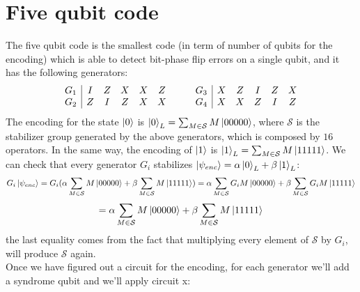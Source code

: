 \documentclass{article}
\begin{document}
	 \section{Five qubit code}
	 The five qubit code is the smallest code (in term of number of qubits for the encoding) which is able to detect bit-phase flip errors on a single qubit, and it has the following generators:
	 \[
	 \begin{array}{c|c c c c c}
	 	G_1 & I & Z & X & X & Z\\
	 	G_2 & Z & I & Z & X & X
	 \end{array}\qquad
	 \begin{array}{c|c c c c c}
	 	G_3 & X & Z & I & Z & X\\
	 	G_4 & X & X & Z & I & Z
	 \end{array}
	 \]
	 The encoding for the state $\ket{0}$ is $\ket{0}_L = \sum_{M \in \mathcal{S}}M\ket{00000}$, where $\mathcal{S}$ is the stabilizer group generated by the above generators, which is composed by $16$ operators. In the same way, the encoding of $\ket{1}$ is $\ket{1}_L = \sum_{M \in \mathcal{S}}M\ket{11111}$. We can check that every generator $G_i$ stabilizes $\ket{\psi_{enc}} = \alpha\ket{0}_L + \beta\ket{1}_L$:
	 \[ G_i\ket{\psi_{enc}} = G_i(\alpha\sum_{M \in \mathcal{S}}M\ket{00000} + \beta\sum_{M \in \mathcal{S}}M\ket{11111}) = \alpha\sum_{M \in \mathcal{S}}G_iM\ket{00000} + \beta\sum_{M \in \mathcal{S}}G_iM\ket{11111} \]
	 \[  = \alpha\sum_{M \in \mathcal{S}}M\ket{00000} + \beta\sum_{M \in \mathcal{S}}M\ket{11111} \]
	 the last equality comes from the fact that multiplying every element of $\mathcal{S}$ by $G_i$, will produce $\mathcal{S}$ again.\\
	 Once we have figured out a circuit for the encoding, for each generator we'll add a syndrome qubit and we'll apply circuit x: 
	 \begin{figure}[H]
	 	\centering
	 \end{figure}
\end{document}
